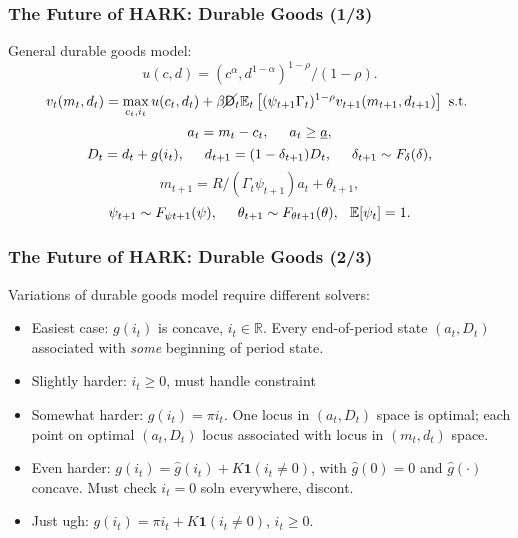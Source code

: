 \documentclass[11pt,handout]{beamer}
\newcommand{\E}{\mathbb{E}}
\newcommand{\R}{\mathbb{R}}
\newcommand{\bi}{\begin{itemize}}
\newcommand{\ei}{\end{itemize}}
\newcommand{\Die}{\mathsf{D}}
\newcommand{\Live}{\cancel{\Die}}
\begin{document}
\begin{frame}
\frametitle{The Future of HARK: Durable Goods (1/3)}

General durable goods model:
\begin{equation*}
u(c,d) = (c^\alpha,d^{1-\alpha})^{1-\rho}/(1-\rho).
\end{equation*}
\begin{equation*}
v_t(m_t,d_t) = \max_{c_t,i_t} u(c_t,d_t) + \beta \Live_t \E_t \left[(\psi_{t+1} \Gamma_t)^{1-\rho} v_{t+1}(m_{t+1},d_{t+1}) \right] \text{ s.t. }
\end{equation*}
\begin{equation*}
a_t = m_t - c_t, \hspace{0.5cm} a_t \geq \underline{a},
\end{equation*}
\begin{equation*}
D_t = d_t + g(i_t), \hspace{0.5cm} d_{t+1} = (1-\delta_{t+1})D_t, \hspace{0.5cm} \delta_{t+1} \sim F_{\delta}(\delta),
\end{equation*}
\begin{equation*}
m_{t+1} = R/(\Gamma_t \psi_{t+1}) a_t + \theta_{t+1}, 
\end{equation*}
\begin{equation*}
\psi_{t+1} \sim F_{\psi t+1}(\psi), \hspace{0.5cm} \theta_{t+1} \sim F_{\theta t+1}(\theta), \hspace{0.25cm} \E[\psi_t] = 1.
\end{equation*}
\end{frame}



\begin{frame}
\frametitle{The Future of HARK: Durable Goods (2/3)}
Variations of durable goods model require different solvers:
\bi
\item <1-> Easiest case: $g(i_t)$ is concave, $i_t \in \R$.  Every end-of-period state $(a_t,D_t)$ associated with \textit{some} beginning of period state.

\item <1->Slightly harder: $i_t \geq 0$, must handle constraint

\item <2->Somewhat harder: $g(i_t) = \pi i_t$.  One locus in $(a_t,D_t)$ space is optimal; each point on optimal $(a_t,D_t)$ locus associated with locus in $(m_t,d_t)$ space.

\item <3->Even harder: $g(i_t) = \widehat{g}(i_t) + K \mathbf{1}(i_t \neq 0)$, with $\widehat{g}(0) = 0$ and $\widehat{g}(\cdot)$ concave.  Must check $i_t=0$ soln everywhere, discont.

\item <4->Just ugh: $g(i_t) = \pi i_t +K \mathbf{1}(i_t \neq 0)$, $i_t \geq 0$.
\ei
\end{frame}
\end{document}

